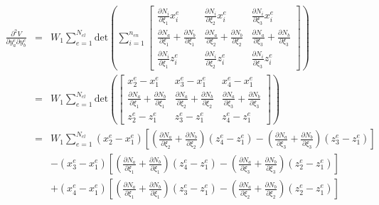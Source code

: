 \documentclass[12pt,aps,pre]{revtex4}
\begin{document}
\begin{eqnarray}
\frac{\partial^2 V}{\partial y_a^e \partial y_b^e} &=& W_1\sum_{e=1}^{N_{el}} \text{det}\left(\sum_{i=1}^{n_{en}} \begin{bmatrix}
\frac{\partial N_i}{\partial \xi_1}x_i^e  & \frac{\partial N_i}{\partial \xi_2}x_i^e  & \frac{\partial N_i}{\partial \xi_3}x_i^e  \\
%
\frac{\partial N_a}{\partial \xi_1}+\frac{\partial N_b}{\partial \xi_1} & \frac{\partial N_a}{\partial \xi_2}+\frac{\partial N_b}{\partial \xi_2}& \frac{\partial N_a}{\partial \xi_3}+\frac{\partial N_b}{\partial \xi_3} \\
%
\frac{\partial N_i}{\partial \xi_1}z_i^e & \frac{\partial N_i}{\partial \xi_2}z_i^e & \frac{\partial N_i}{\partial \xi_3}z_i^e 
\end{bmatrix}\right) \nonumber\\
&=& W_1\sum_{e=1}^{N_{el}} \text{det}\left( \begin{bmatrix}
x_2^e - x_1^e & x_3^e - x_1^e & x_4^e - x_1^e \\
%
\frac{\partial N_a}{\partial \xi_1}+\frac{\partial N_b}{\partial \xi_1} & \frac{\partial N_a}{\partial \xi_2}+\frac{\partial N_b}{\partial \xi_2}& \frac{\partial N_a}{\partial \xi_3}+\frac{\partial N_b}{\partial \xi_3} \\
%
z_2^e - z_1^e & z_3^e - z_1^e & z_4^e - z_1^e 
\end{bmatrix}\right) \nonumber\\
%
&=&W_1\sum_{e=1}^{N_{el}}(x_2^e - x_1^e)\left[\left(\frac{\partial N_a}{\partial \xi_2}+\frac{\partial N_b}{\partial \xi_2}\right)(z_4^e - z_1^e)-\left(\frac{\partial N_a}{\partial \xi_3}+\frac{\partial N_b}{\partial \xi_3}\right)(z_3^e - z_1^e)\right] \nonumber\\
%
&&-(x_3^e - x_1^e)\left[\left(\frac{\partial N_a}{\partial \xi_1}+\frac{\partial N_b}{\partial \xi_1}\right)(z_4^e - z_1^e)-\left(\frac{\partial N_a}{\partial \xi_3}+\frac{\partial N_b}{\partial \xi_3}\right)(z_2^e - z_1^e)\right] \nonumber\\
%
&&+(x_4^e - x_1^e)\left[\left(\frac{\partial N_a}{\partial \xi_1}+\frac{\partial N_b}{\partial \xi_1}\right)(z_3^e - z_1^e)-\left(\frac{\partial N_a}{\partial \xi_2}+\frac{\partial N_b}{\partial \xi_2}\right)(z_2^e - z_1^e)\right] 
\end{eqnarray}
\end{document}
